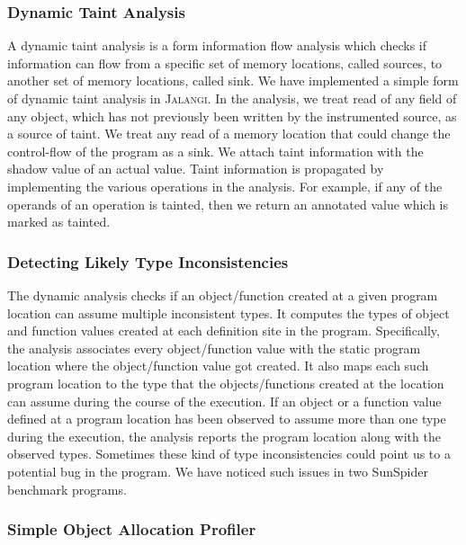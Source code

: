 \documentclass{sig-alternate}
\def\jalangi{\textsc{Jalangi}}
\begin{document}
\subsubsection*{Dynamic Taint Analysis}
\label{sec:taint-analysis}

A dynamic taint analysis is a form information flow analysis which
checks if information can flow from a specific set of memory
locations, called sources, to another set of memory locations, called
sink.  We have implemented a simple form of dynamic taint analysis in
\jalangi{}.  In the analysis, we treat read of any field of any
object, which has not previously been written by the instrumented
source, as a source of taint.  We treat any read of a memory location
that could change the control-flow of the program as a sink.  We
attach taint information with the shadow value of an actual value.
Taint information is propagated by implementing the various operations
in the analysis.  For example, if any of the operands of an operation
is tainted, then we return an annotated value which is marked as
tainted.

\subsubsection*{Detecting Likely Type Inconsistencies}
\label{sec:detect-likely-type}

The dynamic analysis checks if an object/function created at a given
program location can assume multiple inconsistent types.  It computes
the types of object and function values created at each definition
site in the program.  Specifically, the analysis associates every
object/function value with the static program location where the
object/function value got created.  It also maps each such program
location to the type that the objects/functions created at the
location can assume during the course of the execution.  If an object
or a function value defined at a program location has been observed to
assume more than one type during the execution, the analysis reports
the program location along with the observed types.  Sometimes these
kind of type inconsistencies could point us to a potential bug in the
program.  We have noticed such issues in two SunSpider benchmark
programs.

\subsubsection*{Simple Object Allocation Profiler}
\label{sec:simple-object-alloc}
\end{document}
